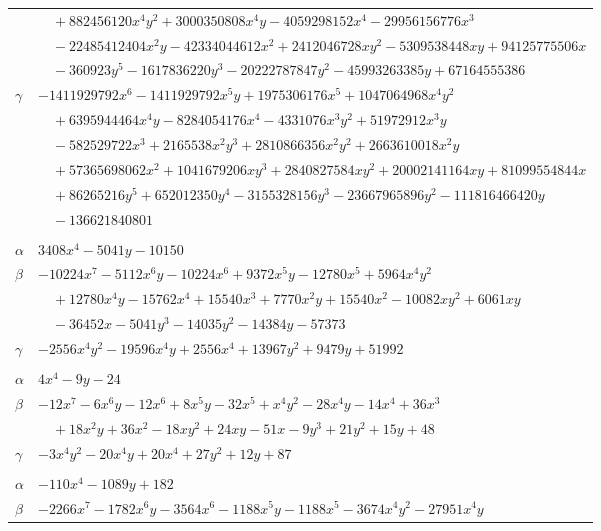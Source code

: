 \documentclass[11pt]{article}
\begin{document}
\begin{longtable}{@{}ll@{}}
 & $\quad +882456120x^{4}y^{2}+3000350808x^{4}y-4059298152x^{4}-29956156776x^{3}$\\
 & $\quad -22485412404x^{2}y-42334044612x^{2}+2412046728xy^{2}-5309538448xy+94125775506x$\\
 & $\quad -360923y^{5}-1617836220y^{3}-20222787847y^{2}-45993263385y+67164555386$\\
$\gamma$ & $-1411929792x^{6}-1411929792x^{5}y+1975306176x^{5}+1047064968x^{4}y^{2}$\\
 & $\quad +6395944464x^{4}y-8284054176x^{4}-4331076x^{3}y^{2}+51972912x^{3}y$\\
 & $\quad -582529722x^{3}+2165538x^{2}y^{3}+2810866356x^{2}y^{2}+2663610018x^{2}y$\\
 & $\quad +57365698062x^{2}+1041679206xy^{3}+2840827584xy^{2}+20002141164xy+81099554844x$\\
 & $\quad +86265216y^{5}+652012350y^{4}-3155328156y^{3}-23667965896y^{2}-111816466420y$\\
 & $\quad -136621840801$\\
\addlinespace[3pt]
\multicolumn{2}{@{}l}{$\{i,j\}=\{10,60\}$, $k_{ij}=2^{2}\cdot 3^{2}\cdot 17$}\\
$\alpha$ & $3408x^{4}-5041y-10150$\\
$\beta$ & $-10224x^{7}-5112x^{6}y-10224x^{6}+9372x^{5}y-12780x^{5}+5964x^{4}y^{2}$\\
 & $\quad +12780x^{4}y-15762x^{4}+15540x^{3}+7770x^{2}y+15540x^{2}-10082xy^{2}+6061xy$\\
 & $\quad -36452x-5041y^{3}-14035y^{2}-14384y-57373$\\
$\gamma$ & $-2556x^{4}y^{2}-19596x^{4}y+2556x^{4}+13967y^{2}+9479y+51992$\\
\addlinespace[3pt]
\multicolumn{2}{@{}l}{$\{i,j\}=\{10,80\}$, $k_{ij}=2\cdot 3^{3}$}\\
$\alpha$ & $4x^{4}-9y-24$\\
$\beta$ & $-12x^{7}-6x^{6}y-12x^{6}+8x^{5}y-32x^{5}+x^{4}y^{2}-28x^{4}y-14x^{4}+36x^{3}$\\
 & $\quad +18x^{2}y+36x^{2}-18xy^{2}+24xy-51x-9y^{3}+21y^{2}+15y+48$\\
$\gamma$ & $-3x^{4}y^{2}-20x^{4}y+20x^{4}+27y^{2}+12y+87$\\
\addlinespace[3pt]
\multicolumn{2}{@{}l}{$\{i,j\}=\{10,100\}$, $k_{ij}=2^{6}\cdot 3^{2}$}\\
$\alpha$ & $-110x^{4}-1089y+182$\\
$\beta$ & $-2266x^{7}-1782x^{6}y-3564x^{6}-1188x^{5}y-1188x^{5}-3674x^{4}y^{2}-27951x^{4}y$\\

\end{longtable}
\end{document}
